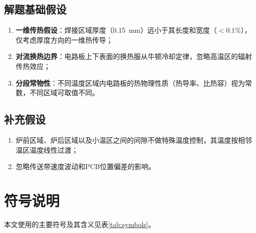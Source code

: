 \documentclass[12pt,a4paper]{ctexart}
\begin{document}
\subsection{解题基础假设}

\begin{enumerate}[label=\textbf{B\arabic*：},nosep]
    \item \textbf{一维传热假设}：焊接区域厚度（0.15~mm）远小于其长度和宽度（$<0.1\%$），仅考虑厚度方向的一维热传导；
    \item \textbf{对流换热边界}：电路板上下表面的换热服从牛顿冷却定律，忽略高温区的辐射传热效应；
    \item \textbf{分段常物性}：不同温度区域内电路板的热物理性质（热导率、比热容）视为常数，不同区域可取值不同。
\end{enumerate}

\subsection{补充假设}

\begin{enumerate}[label=\textbf{C\arabic*：},nosep]
    \item 炉前区域、炉后区域以及小温区之间的间隙不做特殊温度控制，其温度按相邻温区温度线性过渡；
    \item 忽略传送带速度波动和PCB位置偏差的影响。
\end{enumerate}

\newpage
\section{符号说明}

本文使用的主要符号及其含义见表\ref{tab:symbols}。
\end{document}
